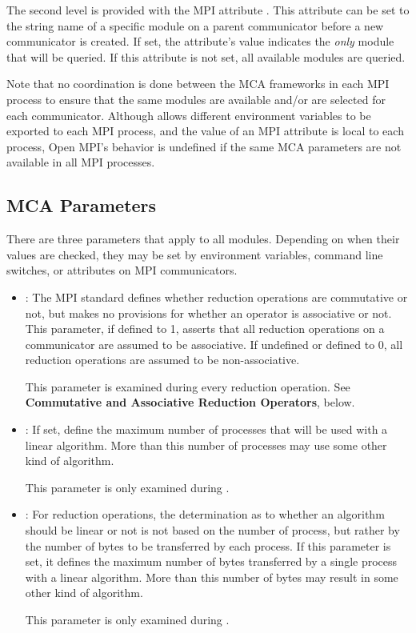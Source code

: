 The second level is provided with the MPI attribute
.  This attribute can be set to
the string name of a specific  module on a parent
communicator before a new communicator is created.  If set, the
attribute's value indicates the {\em only} module that will be
queried.  If this attribute is not set, all available modules are
queried.

Note that no coordination is done between the MCA frameworks in each
MPI process to ensure that the same modules are available and/or are
selected for each communicator.  Although  allows
different environment variables to be exported to each MPI process,
and the value of an MPI attribute is local to each process, Open MPI's
behavior is undefined if the same MCA parameters are not available in
all MPI processes.


\subsection{ MCA Parameters}

There are three parameters that apply to all  modules.
Depending on when their values are checked, they may be set by
environment variables, command line switches, or attributes on MPI
communicators.

\begin{itemize}
\item {}: The MPI standard defines
  whether reduction operations are commutative or not, but makes no
  provisions for whether an operator is associative or not.  This
  parameter, if defined to 1, asserts that all reduction operations on
  a communicator are assumed to be associative.  If undefined or
  defined to 0, all reduction operations are assumed to be
  non-associative.  
  
  This parameter is examined during every reduction operation.  See
  {\bf Commutative and Associative Reduction Operators}, below.
  
\item {}: If set, define the maximum number
  of processes that will be used with a linear algorithm.  More than
  this number of processes may use some other kind of algorithm.

  This parameter is only examined during .
  
\item {}: For reduction
  operations, the determination as to whether an algorithm should be
  linear or not is not based on the number of process, but rather by
  the number of bytes to be transferred by each process.  If this
  parameter is set, it defines the maximum number of bytes transferred
  by a single process with a linear algorithm.  More than this number
  of bytes may result in some other kind of algorithm.

  This parameter is only examined during .
\end{itemize}

